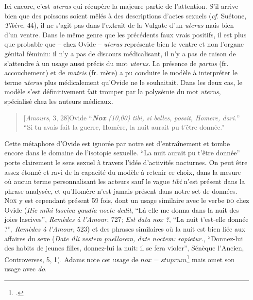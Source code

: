 Ici encore, c'est \textit{uterus} qui récupère la majeure partie de l'attention. S'il arrive bien que des poissons soient mêlés à des descriptions d'actes sexuels (\textit{cf.} Suétone, \textit{Tibère}, 44), il ne s'agit pas dans l'extrait de la Vulgate d'un \textit{uterus} mais bien d'un ventre. Dans le même genre que les précédents faux vrais positifs, il est plus que probable que -- chez Ovide -- \textit{uterus} représente bien le ventre et non l'organe génital féminin: il n'y a pas de discours médicalisant, il n'y a pas de raison de s'attendre à un usage aussi précis du mot \textit{uterus}. La présence de \textit{partus} (fr. accouchement) et de \textit{matris} (fr. mère) a pu conduire le modèle à interpréter le terme \textit{uterus} plus médicalement qu'Ovide ne le souhaitait. Dans les deux cas, le modèle s'est définitivement fait tromper par la polysémie du mot \textit{uterus}, spécialisé chez les auteurs médicaux.

\begin{quote}[\textit{Amours}, 3, 28]{Ovide}
    \enquote{\textit{\textbf{Nox} (10,00) tibi, si belles, possit, Homere, dari.}} \\
    \enquote{Si tu avais fait la guerre, Homère, la nuit aurait pu t'être donnée.}
\end{quote}

Cette métaphore d'Ovide est ignorée par notre set d'entraînement et tombe encore dans le domaine de l'isotopie sexuelle. \enquote{La nuit aurait pu t'être donnée} porte clairement le sens sexuel à travers l'idée d'activités nocturnes. On peut être assez étonné et ravi de la capacité du modèle à retenir ce choix, dans la mesure où aucun terme personnalisant les acteurs sauf le vague \textit{tibi} n'est présent dans la phrase analysée, et qu'Homère n'est jamais présent dans notre set de données. \textsc{Nox} y est cependant présent 59 fois, dont un usage similaire avec le verbe \textsc{do} chez Ovide (\textit{Hic mihi lasciva gaudia nocte dedit}, \enquote{Là elle me donna dans la nuit des joies lascives}, \textit{Remèdes à l'Amour}, 727; \textit{Est data nox ?}, \enquote{La nuit t'est-elle donnée ?}, \textit{Remèdes à l'Amour}, 523) et des phrases similaires où la nuit est bien liée aux affaires du sexe (\textit{Date illi vestem puellarem, date noctem: rapietur.}, \enquote{Donnez-lui des habits de jeunes filles, donnez-lui la nuit: il se fera violer}, Sénèque l'Ancien, Controverses, 5, 1). Adams note cet usage de $nox=stuprum$\footcite[p.178]{adams} mais omet son usage avec \textit{do}.

